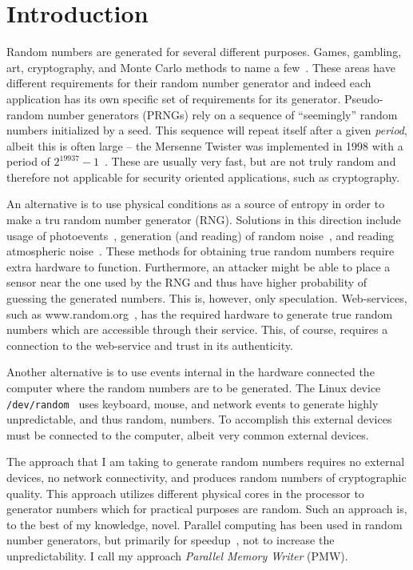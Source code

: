 \section{Introduction}
\label{sec:intro}
Random numbers are generated for several different purposes.
Games, gambling, art, cryptography, and Monte Carlo methods to name a few~\citep{Stojanovski01chaos-basedrandom}.
These areas have different requirements for their random number generator and indeed each application has its own specific set of requirements for its generator.
Pseudo-random number generators (PRNGs) rely on a sequence of ``seemingly'' random numbers initialized by a seed.
This sequence will repeat itself after a given \emph{period}, albeit this is often large -- the Mersenne Twister was implemented in 1998 with a period of $2^{19937}-1$~\citep{Matsumoto98}.
These are usually very fast, but are not truly random and therefore not applicable for security oriented applications, such as cryptography.

An alternative is to use physical conditions as a source of entropy in order to make a tru random number generator (RNG).
Solutions in this direction include usage of photoevents~\citep{Martino91}, generation (and reading) of random noise~\citep{Holman97}, and reading atmospheric noise~\citep{random.org}.
These methods for obtaining true random numbers require extra hardware to function.
Furthermore, an attacker might be able to place a sensor near the one used by the RNG and thus have higher probability of guessing the generated numbers.
This is, however, only speculation.
Web-services, such as www.random.org~\citep{random.org}, has the required hardware to generate true random numbers which are accessible through their service.
This, of course, requires a connection to the web-service and trust in its authenticity.

Another alternative is to use events internal in the hardware connected the computer where the random numbers are to be generated.
The Linux device \texttt{/dev/random}~\citep{devrandom} uses keyboard, mouse, and network events to generate highly unpredictable, and thus random, numbers.
To accomplish this external devices must be connected to the computer, albeit very common external devices.

The approach that I am taking to generate random numbers requires no external devices, no network connectivity, and produces random numbers of cryptographic quality.
This approach utilizes different physical cores in the processor to generator numbers which for practical purposes are random.
Such an approach is, to the best of my knowledge, novel.
Parallel computing has been used in random number generators, but primarily for speedup~\citep{parallelRand}, not to increase the unpredictability.
I call my approach \emph{Parallel Memory Writer} (PMW).

